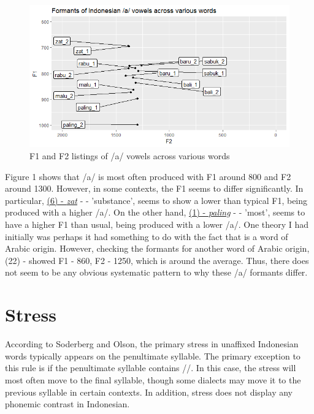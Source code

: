 \documentclass[a4paper, 12pt]{article}
\begin{document}
\begin{figure}[H]
	\includegraphics[width=\linewidth]{images/a_formants.png}
	\caption{F1 and F2 listings of /a/ vowels across various words}
	\label{fig:a_formants} 
\end{figure}
\medskip

Figure 1 shows that /a/ is most often produced with F1 around 800 and F2 around 1300. However, in some contexts, the F1 seems to differ significantly. In particular, \hyperlink{zat}{(6) - \textit{zat}} - \textipa{["za\|[t\textcorner]} - 'substance', seems to show a lower than typical F1, being produced with a higher /a/. On the other hand, \hyperlink{paling}{(1) - \textit{paling}} -  - 'most', seems to have a higher F1 than usual, being produced with a lower /a/. One theory I had initially was perhaps it had something to do with the fact that \textipa{["za\|[t\textcorner]} is a word of Arabic origin. However, checking the formants for another word of Arabic origin, (22) - \textipa{["maPaf]} showed F1 - 860, F2 - 1250, which is around the average. Thus, there does not seem to be any obvious systematic pattern to why these /a/ formants differ.

\bigskip

\section{Stress}

According to Soderberg and Olson, the primary stress in unaffixed Indonesian words typically appears on the penultimate syllable. The primary exception to this rule is if the penultimate syllable contains /\textschwa/. In this case, the stress will most often move to the final syllable, though some dialects may move it to the previous syllable in certain contexts.  In addition, stress does not display any phonemic contrast in Indonesian.
\end{document}

